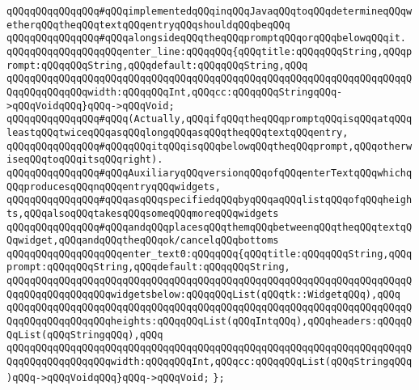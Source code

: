 \verb|qQQqqQQqqQQqqQQq#qQQqimplementedqQQqinqQQqJavaqQQqtoqQQqdetermineqQQqwetherqQQqtheqQQqtextqQQqentryqQQqshouldqQQqbeqQQq|\newline
\verb|qQQqqQQqqQQqqQQq#qQQqalongsideqQQqtheqQQqpromptqQQqorqQQqbelowqQQqit.|\newline
\newline
\verb|qQQqqQQqqQQqqQQqqQQqenter_line:qQQqqQQq{qQQqtitle:qQQqqQQqString,qQQqprompt:qQQqqQQqString,qQQqdefault:qQQqqQQqString,qQQq|\newline
\verb|qQQqqQQqqQQqqQQqqQQqqQQqqQQqqQQqqQQqqQQqqQQqqQQqqQQqqQQqqQQqqQQqqQQqqQQqqQQqqQQqqQQqwidth:qQQqqQQqInt,qQQqcc:qQQqqQQqStringqQQq->qQQqVoidqQQq}qQQq->qQQqVoid;|\newline
\newline
\verb|qQQqqQQqqQQqqQQq#qQQq(Actually,qQQqifqQQqtheqQQqpromptqQQqisqQQqatqQQqleastqQQqtwiceqQQqasqQQqlongqQQqasqQQqtheqQQqtextqQQqentry,|\newline
\verb|qQQqqQQqqQQqqQQq#qQQqqQQqitqQQqisqQQqbelowqQQqtheqQQqprompt,qQQqotherwiseqQQqtoqQQqitsqQQqright).|\newline
\newline
\verb|qQQqqQQqqQQqqQQq#qQQqAuxiliaryqQQqversionqQQqofqQQqenterTextqQQqwhichqQQqproducesqQQqnqQQqentryqQQqwidgets,|\newline
\verb|qQQqqQQqqQQqqQQq#qQQqasqQQqspecifiedqQQqbyqQQqaqQQqlistqQQqofqQQqheights,qQQqalsoqQQqtakesqQQqsomeqQQqmoreqQQqwidgets|\newline
\verb|qQQqqQQqqQQqqQQq#qQQqandqQQqplacesqQQqthemqQQqbetweenqQQqtheqQQqtextqQQqwidget,qQQqandqQQqtheqQQqok/cancelqQQqbottoms|\newline
\verb|qQQqqQQqqQQqqQQqqQQqenter_text0:qQQqqQQq{qQQqtitle:qQQqqQQqString,qQQqprompt:qQQqqQQqString,qQQqdefault:qQQqqQQqString,|\newline
\verb|qQQqqQQqqQQqqQQqqQQqqQQqqQQqqQQqqQQqqQQqqQQqqQQqqQQqqQQqqQQqqQQqqQQqqQQqqQQqqQQqqQQqqQQqwidgetsbelow:qQQqqQQqList(qQQqtk::WidgetqQQq),qQQq|\newline
\verb|qQQqqQQqqQQqqQQqqQQqqQQqqQQqqQQqqQQqqQQqqQQqqQQqqQQqqQQqqQQqqQQqqQQqqQQqqQQqqQQqqQQqqQQqheights:qQQqqQQqList(qQQqIntqQQq),qQQqheaders:qQQqqQQqList(qQQqStringqQQq),qQQq|\newline
\verb|qQQqqQQqqQQqqQQqqQQqqQQqqQQqqQQqqQQqqQQqqQQqqQQqqQQqqQQqqQQqqQQqqQQqqQQqqQQqqQQqqQQqqQQqwidth:qQQqqQQqInt,qQQqcc:qQQqqQQqList(qQQqStringqQQq)qQQq->qQQqVoidqQQq}qQQq->qQQqVoid;|\newline
\newline
\verb|};|\newline
\newline
\newline

